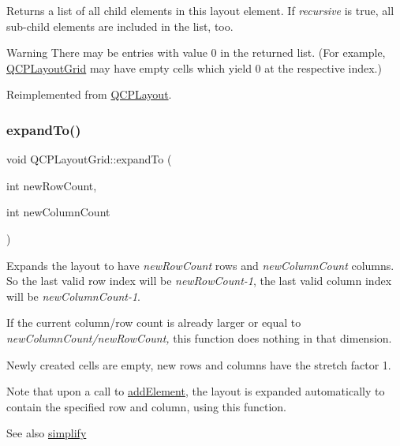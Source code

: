 Returns a list of all child elements in this layout element. If {\itshape recursive} is true, all sub-\/child elements are included in the list, too.

\begin{DoxyWarning}{Warning}
There may be entries with value 0 in the returned list. (For example, \hyperlink{classQCPLayoutGrid}{Q\+C\+P\+Layout\+Grid} may have empty cells which yield 0 at the respective index.) 
\end{DoxyWarning}


Reimplemented from \hyperlink{classQCPLayout_aca129722c019f91d3367046f80abfa77}{Q\+C\+P\+Layout}.

\mbox{\label{classQCPLayoutGrid_a886c0dcbabd51a45da399e044552b685}} 
\subsubsection{\texorpdfstring{expand\+To()}{expandTo()}}
{\footnotesize\ttfamily void Q\+C\+P\+Layout\+Grid\+::expand\+To (\begin{DoxyParamCaption}\item[{int}]{new\+Row\+Count,  }\item[{int}]{new\+Column\+Count }\end{DoxyParamCaption})}

Expands the layout to have {\itshape new\+Row\+Count} rows and {\itshape new\+Column\+Count} columns. So the last valid row index will be {\itshape new\+Row\+Count-\/1}, the last valid column index will be {\itshape new\+Column\+Count-\/1}.

If the current column/row count is already larger or equal to {\itshape new\+Column\+Count/{\itshape new\+Row\+Count},} this function does nothing in that dimension.

Newly created cells are empty, new rows and columns have the stretch factor 1.

Note that upon a call to \hyperlink{classQCPLayoutGrid_adff1a2ca691ed83d2d24a4cd1fe17012}{add\+Element}, the layout is expanded automatically to contain the specified row and column, using this function.

\begin{DoxySeeAlso}{See also}
\hyperlink{classQCPLayoutGrid_a38621ca7aa633b6a9a88617df7f08672}{simplify} 
\end{DoxySeeAlso}
\mbox{\label{classQCPLayoutGrid_ab0cf4f7edc9414a3bfaddac0f46dc0a0}} 
